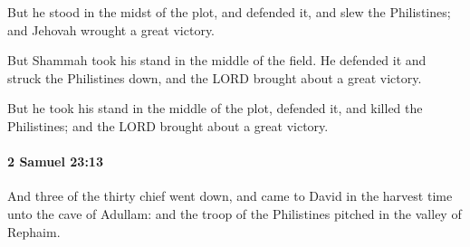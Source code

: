 			\begin{versebox}
					\item[BHS] 
					\item[ASV] But he stood in the midst of the plot, and defended it, and slew the Philistines; and Jehovah wrought a great victory.
					\item[NIV] But Shammah took his stand in the middle of the field. He defended it and struck the Philistines down, and the LORD brought about a great victory.
					\item[NRSV] But he took his stand in the middle of the plot, defended it, and killed the Philistines; and the LORD brought about a great victory.
			\end{versebox}

		\paragraph{2 Samuel 23:13} %
			\label{2SAMUEL-23-13}

			And three of the thirty chief went down, and came to David in the harvest time unto the cave of Adullam: and the troop of the Philistines pitched in the valley of Rephaim.


